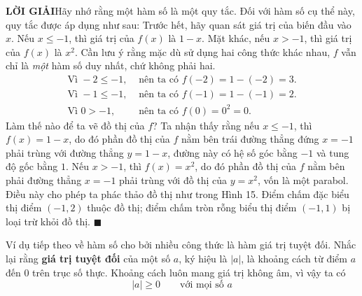 \documentclass[10pt]{article}
\begin{document}
\begin{minipage}[t]{0.71\textwidth}
    \vspace{0.15cm}
    \noindent
    \textbf{\textsf{\color{stewartcyan}LỜI GIẢI}}\quad Hãy nhớ rằng một hàm số là một quy tắc. Đối với hàm số cụ thể này, quy tắc được áp dụng như sau: Trước hết, hãy quan sát giá trị của biến đầu vào $x$. Nếu $x \leqslant -1$, thì giá trị của $f(x)$ là $1 - x$. Mặt khác, nếu $x > -1$, thì giá trị của $f(x)$ là $x^2$. Cần lưu ý rằng mặc dù sử dụng hai công thức khác nhau, $f$ vẫn chỉ là \emph{một} hàm số duy nhất, chứ không phải hai.
    \begin{align*}
    \text{Vì } -2 \leqslant -1, &\text{ nên ta có } f(-2) = 1 - (-2) = 3.\\
    \text{Vì } -1 \leqslant -1, &\text{ nên ta có } f(-1) = 1 - (-1) = 2.\\
    \text{Vì } 0 > -1, &\text{ nên ta có } f(0) = 0^2 = 0.
    \end{align*}
    Làm thế nào để ta vẽ đồ thị của $f$? Ta nhận thấy rằng nếu $x \leqslant -1$, thì $f(x) = 1 - x$, do đó phần đồ thị của $f$ nằm bên trái đường thẳng đứng $x = -1$ phải trùng với đường thẳng $y = 1 - x$, đường này có hệ số góc bằng $-1$ và tung độ gốc bằng $1$. Nếu $x > -1$, thì $f(x) = x^2$, do đó phần đồ thị của $f$ nằm bên phải đường thẳng $x = -1$ phải trùng với đồ thị của $y = x^2$, vốn là một parabol. Điều này cho phép ta phác thảo đồ thị như trong Hình 15. Điểm chấm đặc biểu thị điểm $(-1, 2)$ thuộc đồ thị; điểm chấm tròn rỗng biểu thị điểm $(-1, 1)$ bị loại trừ khỏi đồ thị. \hfill{\color{stewartcyan}$\blacksquare$}

    \vspace{0.25cm}
    Ví dụ tiếp theo về hàm số cho bởi nhiều công thức là hàm giá trị tuyệt đối. Nhắc lại rằng \textbf{giá trị tuyệt đối} của một số $a$, ký hiệu là $|a|$, là khoảng cách từ điểm $a$ đến $0$ trên trục số thực. Khoảng cách luôn mang giá trị không âm, vì vậy ta có
    \[
    |a| \geqslant 0 \qquad \text{với mọi số } a
    \]
\end{minipage}
\end{document}
